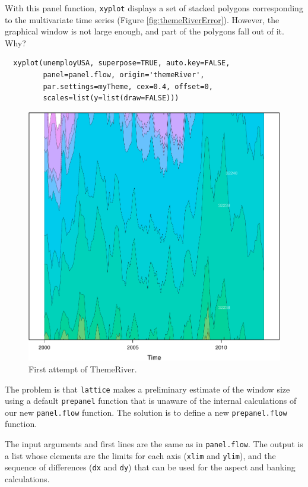 \documentclass[smallroyalvopaper]{memoir}
\begin{document}
With this panel function, \texttt{xyplot} displays a set of stacked
polygons corresponding to the multivariate time series (Figure
\ref{fig:themeRiverError}). However, the graphical window is not
large enough, and part of the polygons fall out of it. Why?

\lstset{language=r,label= ,caption= ,captionpos=b,numbers=none}
\begin{lstlisting}
  xyplot(unemployUSA, superpose=TRUE, auto.key=FALSE,
         panel=panel.flow, origin='themeRiver',
         par.settings=myTheme, cex=0.4, offset=0,
         scales=list(y=list(draw=FALSE)))
\end{lstlisting}

\begin{figure}[htbp]
\centering
\includegraphics[height=0.45\textheight]{figs/ThemeRiverError.pdf}
\caption{\label{fig:org2cb8b60}
First attempt of ThemeRiver.}
\end{figure}

The problem is that \texttt{lattice} makes a preliminary estimate of the
window size using a default \texttt{prepanel} function that is unaware of the
internal calculations of our new \texttt{panel.flow} function. The solution
is to define a new \texttt{prepanel.flow} function. 

The input arguments and first lines are the same as in
\texttt{panel.flow}. The output is a list whose elements are the limits for
each axis (\texttt{xlim} and \texttt{ylim}), and the sequence of differences (\texttt{dx}
and \texttt{dy}) that can be used for the aspect and banking
calculations. 
\end{document}
